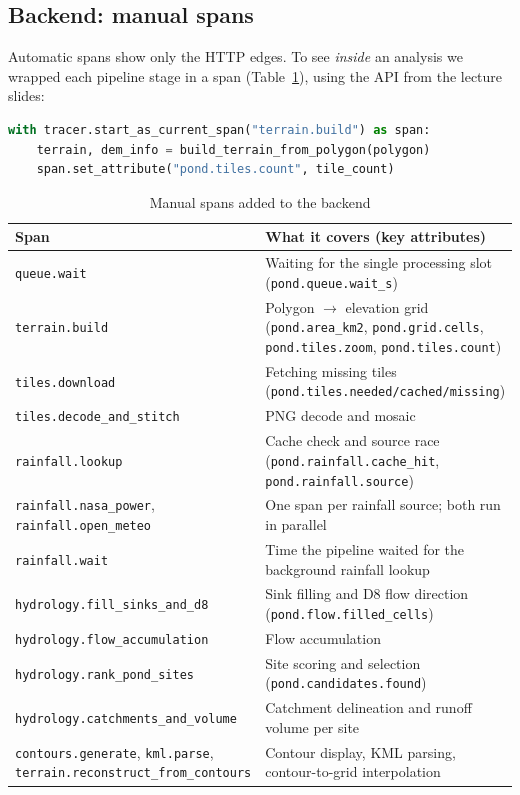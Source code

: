 \documentclass[manuscript,screen]{acmart}
\begin{document}
\subsection{Backend: manual spans}
Automatic spans show only the HTTP edges. To see \emph{inside} an analysis
we wrapped each pipeline stage in a span (Table~\ref{tab:spans}), using the
API from the lecture slides:

\begin{lstlisting}[language=Python]
with tracer.start_as_current_span("terrain.build") as span:
    terrain, dem_info = build_terrain_from_polygon(polygon)
    span.set_attribute("pond.tiles.count", tile_count)
\end{lstlisting}

\begin{table}[h]
\caption{Manual spans added to the backend}
\label{tab:spans}
\small
\begin{tabular}{>{\raggedright\arraybackslash}p{5.2cm}>{\raggedright\arraybackslash}p{8.6cm}}
\toprule
Span & What it covers (key attributes) \\
\midrule
\texttt{queue.wait} & Waiting for the single processing slot (\texttt{pond.queue.wait\_s}) \\
\texttt{terrain.build} & Polygon $\rightarrow$ elevation grid (\texttt{pond.area\_km2}, \texttt{pond.grid.cells}, \texttt{pond.tiles.zoom}, \texttt{pond.tiles.count}) \\
\texttt{tiles.download} & Fetching missing tiles (\texttt{pond.tiles.needed/cached/missing}) \\
\texttt{tiles.decode\_and\_stitch} & PNG decode and mosaic \\
\texttt{rainfall.lookup} & Cache check and source race (\texttt{pond.rainfall.cache\_hit}, \texttt{pond.rainfall.source}) \\
\texttt{rainfall.nasa\_power}, \texttt{rainfall.open\_meteo} & One span per rainfall source; both run in parallel \\
\texttt{rainfall.wait} & Time the pipeline waited for the background rainfall lookup \\
\texttt{hydrology.fill\_sinks\_and\_d8} & Sink filling and D8 flow direction (\texttt{pond.flow.filled\_cells}) \\
\texttt{hydrology.flow\_accumulation} & Flow accumulation \\
\texttt{hydrology.rank\_pond\_sites} & Site scoring and selection (\texttt{pond.candidates.found}) \\
\texttt{hydrology.catchments\_and\_volume} & Catchment delineation and runoff volume per site \\
\texttt{contours.generate}, \texttt{kml.parse}, \texttt{terrain.reconstruct\_from\_contours} & Contour display, KML parsing, contour-to-grid interpolation \\
\bottomrule
\end{tabular}
\end{table}
\end{document}
